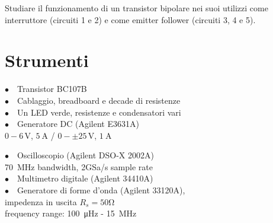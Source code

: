 Studiare il funzionamento di un transistor bipolare nei suoi utilizzi come interruttore (circuiti 1 e 2) e come emitter follower (circuiti 3, 4 e 5).

\section{Strumenti}
%
\noindent
\begin{minipage}{.5\linewidth}
$\bullet \quad$Transistor BC107B\\
$\bullet \quad$Cablaggio, breadboard e decade di resistenze\\
$\bullet \quad$Un LED verde, resistenze e condensatori vari\\
$\bullet \quad$Generatore DC (Agilent E3631A)\\
\phantom{xxxx}$0-6\,\si{\volt}$, $\SI{5}{\ampere}$ / $0-\pm25\,\si{\volt}$, $\SI{1}{\ampere}$\\
\end{minipage}%
\begin{minipage}{.5\linewidth}
$\bullet \quad$Oscilloscopio (Agilent DSO-X 2002A)\\
\phantom{xxxx}\SI{70}{\mega\hertz} bandwidth, 2GSa/s sample rate\\
$\bullet \quad$Multimetro digitale (Agilent 34410A)\\
$\bullet \quad$Generatore di forme d'onda (Agilent 33120A),\\
\phantom{xxxx}impedenza in uscita $R_s=50\si{\ohm}$\\
\phantom{xxxx}frequency range: \SI{100}{\micro\hertz} - \SI{15}{\mega\hertz}\\
\end{minipage}